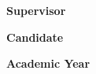 \begin{titlepage}
\begin{center}
\end{center}

\vfill

\noindent
\begin{minipage}[t]{0.46\textwidth}
  \raggedright

  {\large\bfseries Supervisor\par}

  \vspace{3mm}

  {\Large \ThesisSupervisor\par}

\end{minipage}%
\hfill
\begin{minipage}[t]{0.46\textwidth}
  \raggedleft

  {\large\bfseries Candidate\par}

  \vspace{3mm}

  {\Large \ThesisCandidate\par}

\end{minipage}

\vspace{17mm}

\begin{center}
  {\large\bfseries
   Academic Year \ThesisAcademicYear\par}
\end{center}

\vspace*{1mm}

\end{titlepage}

\clearpage{\pagestyle{empty}\cleardoublepage}
